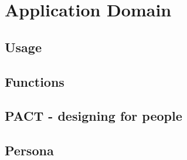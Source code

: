 \chapter{Application Domain}

\section{Usage}\label{usecase}


\section{Functions}


\section{PACT - designing for people}


\section{Persona}

